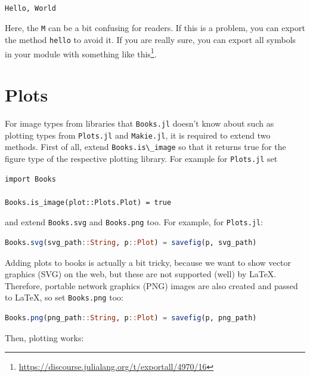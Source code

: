 \documentclass[
  notoc %
]{tufte-book}
\DeclareRobustCommand{\href}[2]{#2\footnote{\url{#1}}}
\newcommand{\passthrough}[1]{#1}
\begin{document}
\begin{lstlisting}[language=Output]

Hello, World

\end{lstlisting}

Here, the \passthrough{\lstinline!M!} can be a bit confusing for
readers. If this is a problem, you can export the method
\passthrough{\lstinline!hello!} to avoid it. If you are really sure, you
can export all symbols in your module with something like
\href{https://discourse.julialang.org/t/exportall/4970/16}{this}.

\hypertarget{sec:plots}{%
\section{Plots}\label{sec:plots}}

For image types from libraries that \passthrough{\lstinline!Books.jl!}
doesn't know about such as plotting types from
\passthrough{\lstinline!Plots.jl!} and
\passthrough{\lstinline!Makie.jl!}, it is required to extend two
methods. First of all, extend \passthrough{\lstinline!Books.is\_image!}
so that it returns true for the figure type of the respective plotting
library. For example for \passthrough{\lstinline!Plots.jl!} set

\begin{lstlisting}
import Books

Books.is_image(plot::Plots.Plot) = true
\end{lstlisting}

and extend \passthrough{\lstinline!Books.svg!} and
\passthrough{\lstinline!Books.png!} too. For example, for
\passthrough{\lstinline!Plots.jl!}:

\begin{lstlisting}[language=Julia]
Books.svg(svg_path::String, p::Plot) = savefig(p, svg_path)
\end{lstlisting}

Adding plots to books is actually a bit tricky, because we want to show
vector graphics (SVG) on the web, but these are not supported (well) by
LaTeX. Therefore, portable network graphics (PNG) images are also
created and passed to LaTeX, so set \passthrough{\lstinline!Books.png!}
too:

\begin{lstlisting}[language=Julia]
Books.png(png_path::String, p::Plot) = savefig(p, png_path)
\end{lstlisting}

Then, plotting works:
\end{document}
